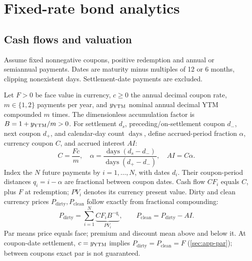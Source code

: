 \chapter{Fixed-rate bond analytics}\label{ch:bonds}
\section{Cash flows and valuation}\label{sec:bond-assumptions}
Assume fixed nonnegative coupons, positive redemption and annual or semiannual payments. Dates are maturity minus multiples of 12 or 6 months, clipping nonexistent days. Settlement-date payments are excluded.

Let \(F>0\) be face value in currency, \(c\geq0\) the annual decimal coupon rate, \(m\in\{1,2\}\) payments per year, and \(y_{\mathrm{YTM}}\) nominal annual decimal YTM compounded \(m\) times. The dimensionless accumulation factor is \(B=1+y_{\mathrm{YTM}}/m>0\).
\label{sec:bond-accrual}
For settlement \(d_s\), preceding/on-settlement coupon \(d_-\), next coupon \(d_+\), and calendar-day count \(\operatorname{days}\), define accrued-period fraction \(\alpha\), currency coupon \(C\), and accrued interest \(AI\):
\begin{equation}\label{eq:accrual}
C=\frac{Fc}{m},\quad
\alpha=\frac{\operatorname{days}(d_s-d_-)}{\operatorname{days}(d_+-d_-)},\quad AI=C\alpha.
\end{equation}
\label{sec:ytm-price}
Index the \(N\) future payments by \(i=1,\ldots,N\), with dates \(d_i\). Their coupon-period distances \(q_i=i-\alpha\) are fractional between coupon dates. Cash flow \(CF_i\) equals \(C\), plus \(F\) at redemption; \(PV_i\) denotes its currency present value. Dirty and clean currency prices \(P_{\mathrm{dirty}},P_{\mathrm{clean}}\) follow exactly from fractional compounding:
\begin{equation}\label{eq:ytm-price}
P_{\mathrm{dirty}}=\sum_{i=1}^N\underbrace{CF_iB^{-q_i}}_{PV_i},
\qquad P_{\mathrm{clean}}=P_{\mathrm{dirty}}-AI.
\end{equation}
\label{sec:par}
Par means price equals face; premium and discount mean above and below it. At coupon-date settlement, \(c=y_{\mathrm{YTM}}\) implies \(P_{\mathrm{dirty}}=P_{\mathrm{clean}}=F\) (\cref{sec:app-par}); between coupons exact par is not guaranteed.

